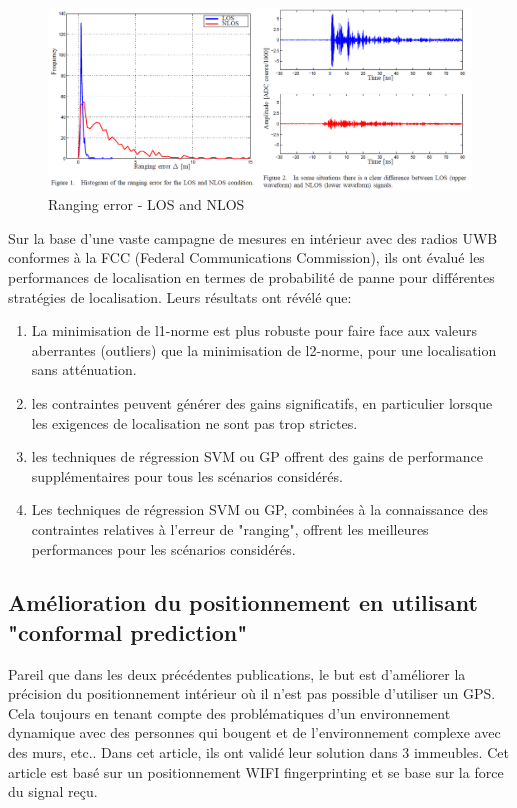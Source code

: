 \begin{figure}[htp]
	\begin{center}
		\includegraphics[scale=0.6]{figures/LosNlos.png}
		\caption{Ranging error - LOS and NLOS \cite{ML_UWB}}
		\label{fig:LosNlos} %
	\end{center}
\end{figure}

Sur la base d'une vaste campagne de mesures en intérieur avec des radios UWB conformes à la FCC (Federal Communications Commission), ils ont évalué les performances de localisation en termes de probabilité de panne pour différentes stratégies de localisation. Leurs résultats ont révélé que: 

\begin{enumerate}
	\item La minimisation de l1-norme est plus robuste pour faire face aux valeurs aberrantes (outliers) que la minimisation de l2-norme, pour une localisation sans atténuation.
	\item les contraintes peuvent générer des gains significatifs, en particulier lorsque les exigences de localisation ne sont pas trop strictes.
	\item les techniques de régression SVM ou GP offrent des gains de performance supplémentaires pour tous les scénarios considérés.
	\item Les techniques de régression SVM ou GP, combinées à la connaissance des contraintes relatives à l'erreur de "ranging", offrent les meilleures performances pour les scénarios considérés.
\end{enumerate}

\subsection{Amélioration du positionnement en utilisant "conformal prediction" \cite{CP_RSS}}
Pareil que dans les deux précédentes publications, le but est d'améliorer la précision du positionnement intérieur où il n'est pas possible d'utiliser un GPS. Cela toujours en tenant compte des problématiques d'un environnement dynamique avec des personnes qui bougent et de l'environnement complexe avec des murs, etc.. Dans cet article, ils ont validé leur solution dans 3 immeubles. Cet article est basé sur un positionnement WIFI fingerprinting et se base sur la force du signal reçu.

